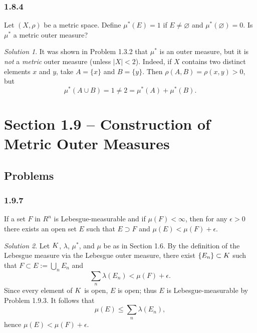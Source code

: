 \documentclass{report}
\let\sc\relax
\newcommand{\sc}[1]{\mathscr{#1}}
\theoremstyle{remark}
\newtheorem*{solution}{Solution}
\begin{document}
\subsubsection*{1.8.4}
Let $(X,\rho)$ be a metric space. Define $\mu^*(E) = 1$ if $E \ne \varnothing$ and $\mu^*(\varnothing) = 0$. Is $\mu^*$ a metric outer measure?

\begin{solution}
  It was shown in Problem 1.3.2 that $\mu^*$ is an outer measure, but it is \emph{not} a \emph{metric} outer measure (unless $|X| < 2$). Indeed, if $X$ contains two distinct elements $x$ and $y$, take $A = \{x\}$ and $B = \{y\}$. Then $\rho(A,B) = \rho(x,y) > 0$, but
  \begin{equation*}
    \mu^*(A \cup B) = 1 \ne 2 = \mu^*(A) + \mu^*(B).
  \end{equation*}
\end{solution}


\section*{Section 1.9 -- Construction of Metric Outer Measures}

\subsection*{Problems}

\subsubsection*{1.9.7}
If a set $F$ in $R^n$ is Lebesgue-measurable and if $\mu(F) < \infty$, then for any $\epsilon > 0$ there exists an open set $E$ such that $E \supset F$ and $\mu(E) < \mu(F) + \epsilon$.

\begin{solution}
  Let $\sc K$, $\lambda$, $\mu^*$, and $\mu$ be as in Section 1.6. By the definition of the Lebesgue measure via the Lebesgue outer measure, there exist $\{E_n\} \subset \sc K$ such that $F \subset E := \bigcup_n E_n$ and
  \begin{equation*}
    \sum_n \lambda(E_n) < \mu(F) + \epsilon.
  \end{equation*}
  Since every element of $\sc K$ is open, $E$ is open; thus $E$ is Lebesgue-measurable by Problem 1.9.3. It follows that
  \begin{equation*}
    \mu(E) \le \sum_n \lambda(E_n),
  \end{equation*}
  hence $\mu(E) < \mu(F) + \epsilon$.
\end{solution}
\end{document}
